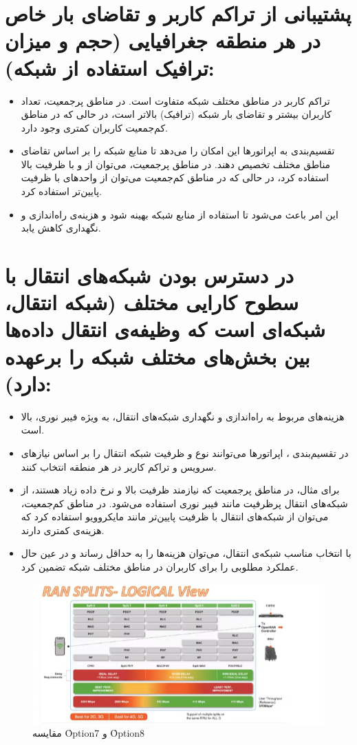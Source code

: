 \documentclass[landscape, 12pt]{report}
\begin{document}
\section*{پشتیبانی از تراکم کاربر و تقاضای بار خاص در هر منطقه جغرافیایی (حجم و میزان ترافیک استفاده از شبکه):}

\begin{itemize}
    \item تراکم کاربر در مناطق مختلف شبکه متفاوت است. در مناطق پرجمعیت، تعداد کاربران بیشتر و تقاضای بار شبکه (ترافیک) بالاتر است، در حالی که در مناطق کم‌جمعیت کاربران کمتری وجود دارد.
    \item تقسیم‌بندی  به اپراتورها این امکان را می‌دهد تا منابع شبکه را بر اساس تقاضای مناطق مختلف تخصیص دهند. در مناطق پرجمعیت، می‌توان از  و  با ظرفیت بالا استفاده کرد، در حالی که در مناطق کم‌جمعیت می‌توان از واحدهای با ظرفیت پایین‌تر استفاده کرد.
    \item این امر باعث می‌شود تا استفاده از منابع شبکه بهینه شود و هزینه‌ی راه‌اندازی و نگهداری کاهش یابد.
\end{itemize}

\section*{در دسترس بودن شبکه‌های انتقال با سطوح کارایی مختلف (شبکه انتقال، شبکه‌ای است که وظیفه‌ی انتقال داده‌ها بین بخش‌های مختلف شبکه را برعهده دارد):}

\begin{itemize}
    \item هزینه‌های مربوط به راه‌اندازی و نگهداری شبکه‌های انتقال، به ویژه فیبر نوری، بالا است.
    \item در تقسیم‌بندی ، اپراتورها می‌توانند نوع و ظرفیت شبکه انتقال را بر اساس نیازهای سرویس و تراکم کاربر در هر منطقه انتخاب کنند.
    \item برای مثال، در مناطق پرجمعیت که نیازمند ظرفیت بالا و نرخ داده زیاد هستند، از شبکه‌های انتقال پرظرفیت مانند فیبر نوری استفاده می‌شود. در مناطق کم‌جمعیت، می‌توان از شبکه‌های انتقال با ظرفیت پایین‌تر مانند مایکروویو استفاده کرد که هزینه‌ی کمتری دارند.
    \item با انتخاب مناسب شبکه‌ی انتقال، می‌توان هزینه‌ها را به حداقل رساند و در عین حال عملکرد مطلوبی را برای کاربران در مناطق مختلف شبکه تضمین کرد.
\end{itemize}

\begin{figure}[ht]
	\centering
	\includegraphics[width=.6\linewidth]{Pic/RAN}
	\caption{  مقایسه \r{Option7} و \r{Option8}
	}
	\label{fig:Fronthaul_Midhaul_Backhaul}
\end{figure}
\end{document}
